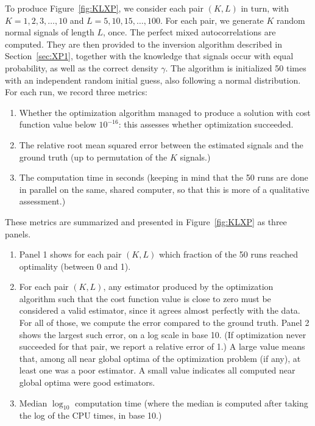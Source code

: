 \documentclass[12pt]{article}
\newcommand{\1}{\mathbf{1}}
\theoremstyle{plain}
\theoremstyle{definition}
\theoremstyle{remark}
\theoremstyle{plain}
\theoremstyle{remark}
\theoremstyle{plain}
\theoremstyle{plain}
\theoremstyle{plain}
\numberwithin{equation}{section}
\begin{document}
To produce Figure~\ref{fig:KLXP}, we consider each pair $(K, L)$ in turn, with $K = 1, 2, 3, \ldots, 10$ and $L = 5, 10, 15, \ldots, 100$. For each pair, we generate $K$ random normal signals of length $L$, once. The perfect mixed autocorrelations are computed. They are then provided to the inversion algorithm described in Section~\ref{sec:XP1}, together with the knowledge that signals occur with equal probability, as well as the correct density $\gamma$. The algorithm is initialized 50 times with an independent random initial guess, also following a normal distribution. For each run, we record three metrics:
\begin{enumerate}
	\item Whether the optimization algorithm managed to produce a solution with cost function value below $10^{-16}$: this assesses whether optimization succeeded.
	\item The relative root mean squared error between the estimated signals and the ground truth (up to permutation of the $K$ signals.)
	\item The computation time in seconds (keeping in mind that the 50 runs are done in parallel on the same, shared computer, so that this is more of a qualitative assessment.)
\end{enumerate}
These metrics are summarized and presented in Figure~\ref{fig:KLXP} as three panels.
\begin{enumerate}
	\item Panel 1 shows for each pair $(K, L)$ which fraction of the 50 runs reached optimality (between 0 and 1).
	\item For each pair $(K, L)$, any estimator produced by the optimization algorithm such that the cost function value is close to zero must be considered a valid estimator, since it agrees almost perfectly with the data. For all of those, we compute the error compared to the ground truth. Panel 2 shows the largest such error, on a log scale in base 10. (If optimization never succeeded for that pair, we report a relative error of 1.) A large value means that, among all near global optima of the optimization problem (if any), at least one was a poor estimator. A small value indicates all computed near global optima were good estimators.
	\item Median $\log_{10}$ computation time (where the median is computed after taking the log of the CPU times, in base 10.)
\end{enumerate}
\end{document}

